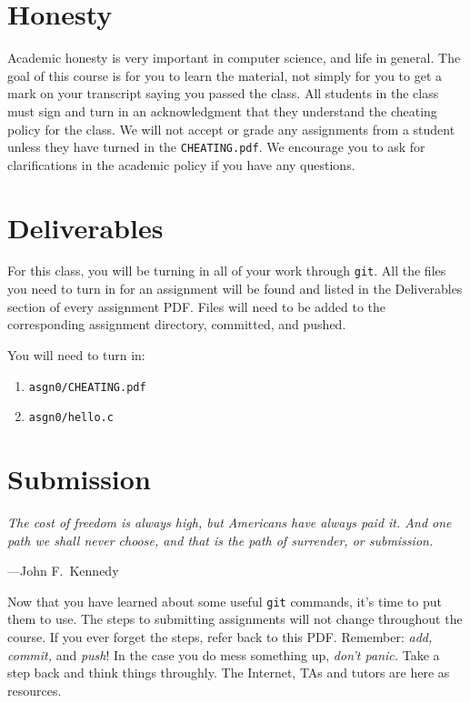 \documentclass[11pt]{article}
\newcommand\asgn[0]{asgn0}
\begin{document}
\section{Honesty}

Academic honesty is very important in computer science, and life in general. The
goal of this course is for you to learn the material, not simply for you to get
a mark on your transcript saying you passed the class. All students in the class
must sign and turn in an acknowledgment that they understand the cheating policy
for the class. We will not accept or grade any assignments from a student unless
they have turned in the \texttt{CHEATING.pdf}. We encourage you to ask for
clarifications in the academic policy if you have any questions.

\section{Deliverables}


\noindent For this class, you will be turning in all of your work through
\texttt{git}. All the files you need to turn in for an assignment will be found
and listed in the Deliverables section of every assignment PDF. Files will need
to be added to the corresponding assignment directory, committed, and pushed.

You will need to turn in:
\begin{enumerate}
	\item \texttt{\asgn/CHEATING.pdf}
	\item \texttt{\asgn/hello.c}
\end{enumerate}

\section{Submission}

\epigraph{\emph{The cost of freedom is always high, but Americans have always
paid it. And one path we shall never choose, and that is the path of
surrender, or submission.}}{---John F.\ Kennedy}\noindent

\noindent Now that you have learned about some useful \texttt{git} commands,
it's time to put them to use. The steps to submitting assignments will not
change throughout the course. If you ever forget the steps, refer back to this
PDF. Remember: \emph{add, commit,} and \emph{push}! In the case you do mess
something up, \emph{don't panic.} Take a step back and think things throughly.
The Internet, TAs and tutors are here as resources.
\end{document}
